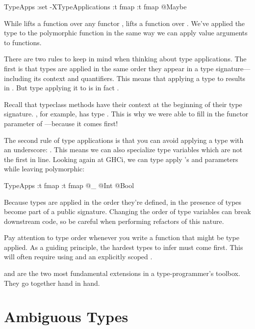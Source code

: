 \documentclass[book.tex]{subfiles}
\begin{document}
\begin{dorepl}{TypeApps}
:set -XTypeApplications
:t fmap
:t fmap @Maybe
\end{dorepl}

While  lifts a function over any functor , \;
lifts a function over . We've applied the type  to the
polymorphic function  in the same way we can apply value arguments to
functions.

There are two rules to keep in mind when thinking about type applications. The
first is that types are applied in the same order they appear in a type
signature---including its context and  quantifiers. This means that
applying a type  to  results in .
But type applying it to  is in fact .

Recall that typeclass methods have their context at the beginning of their type
signature. , for example, has type . This is why we were able to fill in the functor parameter of
---because it comes first!

The second rule of type applications is that you can avoid applying a type with
an underscore: . This means we can also specialize type variables which
are not the first in line. Looking again at GHCi, we can type apply 's
 and  parameters while leaving  polymorphic:

\begin{dorepl}{TypeApps}
:t fmap
:t fmap @_ @Int @Bool
\end{dorepl}

Because types are applied in the order they're defined, in the presence of
 types become part of a public signature. Changing the
order of type variables can break downstream code, so be careful when performing
refactors of this nature.

Pay attention to type order whenever you write a function that might be type
applied. As a guiding principle, the hardest types to infer must come first.
This will often require using  and an explicitly scoped
.

 and  are the two most
fundamental extensions in a type-programmer's toolbox. They go together hand in
hand.


\section{Ambiguous Types}
\end{document}
